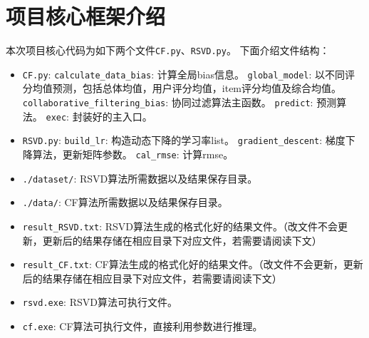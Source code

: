 \section{项目核心框架介绍}
本次项目核心代码为如下两个文件\verb|CF.py|、\verb|RSVD.py|。
下面介绍文件结构：
\begin{itemize}
	\item \verb|CF.py|:
		\iitem \texttt{calculate\_data\_bias}: 计算全局bias信息。
		\iitem \texttt{global\_model}: 以不同评分均值预测，包括总体均值，用户评分均值，item评分均值及综合均值。
		\iitem \texttt{collaborative\_filtering\_bias}: 协同过滤算法主函数。
		\iitem \texttt{predict}: 预测算法。
		\iitem \texttt{exec}: 封装好的主入口。
	\item \verb|RSVD.py|:
		\iitem \texttt{build\_lr}: 构造动态下降的学习率list。
		\iitem \texttt{gradient\_descent}: 梯度下降算法，更新矩阵参数。
		\iitem \texttt{cal\_rmse}: 计算rmse。
	\item \verb|./dataset/|: RSVD算法所需数据以及结果保存目录。
	\item \verb|./data/|: CF算法所需数据以及结果保存目录。
	\item \verb|result_RSVD.txt|: RSVD算法生成的格式化好的结果文件。（改文件不会更新，更新后的结果存储在相应目录下对应文件，若需要请阅读下文）
	\item \verb|result_CF.txt|: CF算法生成的格式化好的结果文件。（改文件不会更新，更新后的结果存储在相应目录下对应文件，若需要请阅读下文）
	\item \verb|rsvd.exe|: RSVD算法可执行文件。
	\item \verb|cf.exe|: CF算法可执行文件，直接利用参数进行推理。
\end{itemize}


